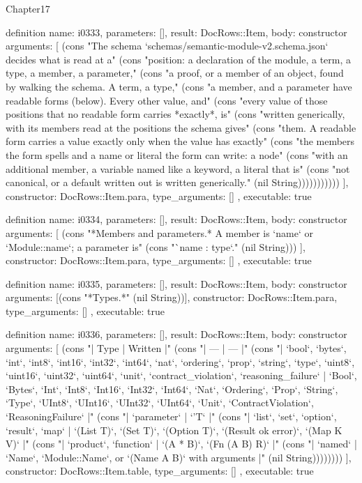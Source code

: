 \begin{lexlean}{Chapter17}
\begin{semanticmodule}
definition{
  name: i0333,
  parameters: [],
  result: DocRows::Item,
  body: constructor{
    arguments: [
      (cons "The schema `schemas/semantic-module-v2.schema.json` decides what is read at a" (cons "position: a declaration of the module, a term, a type, a member, a parameter," (cons "a proof, or a member of an object, found by walking the schema. A term, a type," (cons "a member, and a parameter have readable forms (below). Every other value, and" (cons "every value of those positions that no readable form carries *exactly*, is" (cons "written generically, with its members read at the positions the schema gives" (cons "them. A readable form carries a value exactly only when the value has exactly" (cons "the members the form spells and a name or literal the form can write: a node" (cons "with an additional member, a variable named like a keyword, a literal that is" (cons "not canonical, or a default written out is written generically." (nil String)))))))))))
    ],
    constructor: DocRows::Item.para,
    type_arguments: []
  },
  executable: true
}

definition{
  name: i0334,
  parameters: [],
  result: DocRows::Item,
  body: constructor{
    arguments: [
      (cons "*Members and parameters.* A member is `name` or `Module::name`; a parameter is" (cons "`name : type`." (nil String)))
    ],
    constructor: DocRows::Item.para,
    type_arguments: []
  },
  executable: true
}

definition{
  name: i0335,
  parameters: [],
  result: DocRows::Item,
  body: constructor{
    arguments: [(cons "*Types.*" (nil String))],
    constructor: DocRows::Item.para,
    type_arguments: []
  },
  executable: true
}

definition{
  name: i0336,
  parameters: [],
  result: DocRows::Item,
  body: constructor{
    arguments: [
      (cons "| Type | Written |" (cons "| --- | --- |" (cons "| `bool`, `bytes`, `int`, `int8`, `int16`, `int32`, `int64`, `nat`, `ordering`, `prop`, `string`, `type`, `uint8`, `uint16`, `uint32`, `uint64`, `unit`, `contract_violation`, `reasoning_failure` | `Bool`, `Bytes`, `Int`, `Int8`, `Int16`, `Int32`, `Int64`, `Nat`, `Ordering`, `Prop`, `String`, `Type`, `UInt8`, `UInt16`, `UInt32`, `UInt64`, `Unit`, `ContractViolation`, `ReasoningFailure` |" (cons "| `parameter` | `'T` |" (cons "| `list`, `set`, `option`, `result`, `map` | `(List T)`, `(Set T)`, `(Option T)`, `(Result ok error)`, `(Map K V)` |" (cons "| `product`, `function` | `(A * B)`, `(Fn (A B) R)` |" (cons "| `named` | `Name`, `Module::Name`, or `(Name A B)` with arguments |" (nil String))))))))
    ],
    constructor: DocRows::Item.table,
    type_arguments: []
  },
  executable: true
}


\end{semanticmodule}
\end{lexlean}

